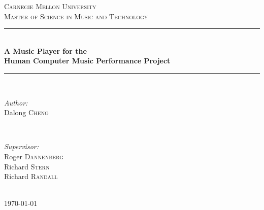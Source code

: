 \documentclass[12pt]{Latex/Classes/PhDthesisPSnPDF}
\begin{document}

\begin{titlepage}

\newcommand{\HRule}{\rule{\linewidth}{0.5mm}} %

\center %

\textsc{\LARGE Carnegie Mellon University}\\[1.5cm] %
\textsc{\Large Master of Science in Music and Technology}\\[0.5cm] %

\HRule \\[0.4cm]
{\large \bfseries A Music Player for the \\ Human Computer Music Performance Project}\\[0.4cm] %
\HRule \\[1.5cm]

\begin{minipage}{0.4\textwidth}
\begin{flushleft} \large
\emph{Author:}\\
Dalong \textsc{Cheng} %
\end{flushleft}
\end{minipage}
~
\begin{minipage}{0.4\textwidth}
\begin{flushright} \large
\emph{Supervisor:} \\
Roger \textsc{Dannenberg} \\ %
Richard \textsc{Stern} \\
Richard \textsc{Randall}
\end{flushright}
\end{minipage}\\[4cm]

{\large \today}\\[3cm] %


\vfill %

\end{titlepage}
\end{document}
